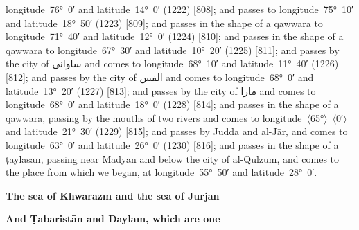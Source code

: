 \documentclass[11pt]{article}
\newcommand{\Pg}[1]{\marginpar{\footnotesize #1}}
\newcommand{\Ang}[1]{\ensuremath{#1}}
\begin{document}
longitude~76°~0′ and latitude~14°~0′ (1222) [808]; and passes to longitude~75°~10′ and latitude~18°~50′ (1223) [809]; and passes in the shape of a qawwāra to longitude~71°~40′ and latitude~12°~0′ (1224) [810]; and passes in the shape of a qawwāra to longitude~67°~30′ and latitude~10°~20′ (1225) [811]; and passes by the city of \textarabic{ساوانى} and comes to longitude~68°~10′ and latitude~11°~40′ (1226) [812]\Pg{p. 80}; and passes by the city of \textarabic{الفس} and comes to longitude~68°~0′ and latitude~13°~20′ (1227) [813]; and passes by the city of \textarabic{مارا} and comes to longitude~68°~0′ and latitude~18°~0′ (1228) [814]; and passes in the shape of a qawwāra, passing by the mouths of two rivers and comes to longitude~\Ang{\langle}65°\Ang{\rangle}~\Ang{\langle}0′\Ang{\rangle} and latitude~21°~30′ (1229) [815]; and passes by Judda and al-Jār, and comes to longitude~63°~0′ and latitude~26°~0′ (1230) [816]; and passes in the shape of a ṭaylasān, passing near Madyan and below the city of al-Qulzum, and comes to the place from which we began, at longitude~55°~50′ and latitude~28°~0′.

\par\medskip\begin{center}\bfseries The sea of Khwārazm and the sea of Jurjān\end{center}\par

\par\medskip\begin{center}\bfseries And Ṭabaristān and Daylam, which are one\end{center}\par
\end{document}
